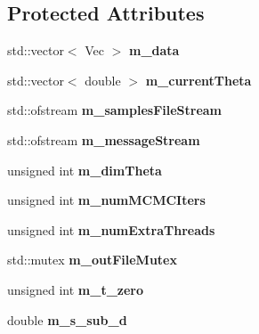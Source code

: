 \subsection*{Protected Attributes}
\begin{DoxyCompactItemize}
\item 
std\+::vector$<$ Vec $>$ {\bfseries m\+\_\+data}\hypertarget{classAdaPmmh_aaf7dd94d1bf397f04b22f87030f6b3a7}{}\label{classAdaPmmh_aaf7dd94d1bf397f04b22f87030f6b3a7}

\item 
std\+::vector$<$ double $>$ {\bfseries m\+\_\+current\+Theta}\hypertarget{classAdaPmmh_ad45ed183d55cb6f2386c952e05af5e63}{}\label{classAdaPmmh_ad45ed183d55cb6f2386c952e05af5e63}

\item 
std\+::ofstream {\bfseries m\+\_\+samples\+File\+Stream}\hypertarget{classAdaPmmh_aea69a3e3a84c15384e5732e84d6aaa66}{}\label{classAdaPmmh_aea69a3e3a84c15384e5732e84d6aaa66}

\item 
std\+::ofstream {\bfseries m\+\_\+message\+Stream}\hypertarget{classAdaPmmh_a48294a6d030acc57f9517a9eed2290f5}{}\label{classAdaPmmh_a48294a6d030acc57f9517a9eed2290f5}

\item 
unsigned int {\bfseries m\+\_\+dim\+Theta}\hypertarget{classAdaPmmh_abd585eb5f5bb3422792fa40373725fd0}{}\label{classAdaPmmh_abd585eb5f5bb3422792fa40373725fd0}

\item 
unsigned int {\bfseries m\+\_\+num\+M\+C\+M\+C\+Iters}\hypertarget{classAdaPmmh_ad9e07b36878459a79528e806f9b65ac5}{}\label{classAdaPmmh_ad9e07b36878459a79528e806f9b65ac5}

\item 
unsigned int {\bfseries m\+\_\+num\+Extra\+Threads}\hypertarget{classAdaPmmh_ac6e644d0c3bfc6ff1b00f09e2311589a}{}\label{classAdaPmmh_ac6e644d0c3bfc6ff1b00f09e2311589a}

\item 
std\+::mutex {\bfseries m\+\_\+out\+File\+Mutex}\hypertarget{classAdaPmmh_aab9ca862f81dd85b369f7d48a20f67a0}{}\label{classAdaPmmh_aab9ca862f81dd85b369f7d48a20f67a0}

\item 
unsigned int {\bfseries m\+\_\+t\+\_\+zero}\hypertarget{classAdaPmmh_a45f9fa266c4aef52ae376179a7501a5f}{}\label{classAdaPmmh_a45f9fa266c4aef52ae376179a7501a5f}

\item 
double {\bfseries m\+\_\+s\+\_\+sub\+\_\+d}\hypertarget{classAdaPmmh_aecc16750ad3d8339db10d56b274f5d1f}{}\label{classAdaPmmh_aecc16750ad3d8339db10d56b274f5d1f}


\end{DoxyCompactItemize}
